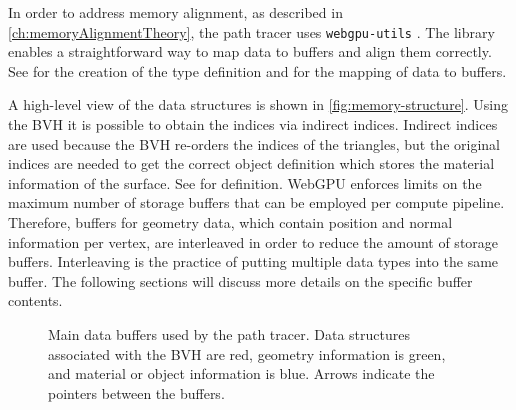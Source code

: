 In order to address memory alignment, as described in \autoref{ch:memoryAlignmentTheory}, the path tracer uses \texttt{webgpu-utils} \cite{webgpuUtilsLib}. The library enables a straightforward way to map data to buffers and align them correctly. See  for the creation of the type definition and  for the mapping of data to buffers.

A high-level view of the data structures is shown in \autoref{fig:memory-structure}. Using the \gls{BVH} it is possible to obtain the indices via indirect indices. Indirect indices are used because the \gls{BVH} re-orders the indices of the triangles, but the original indices are needed to get the correct object definition which stores the material information of the surface. See  for definition. \gls{WebGPU} enforces limits on the maximum number of storage buffers that can be employed per compute pipeline. Therefore, buffers for geometry data, which contain position and normal information per vertex, are interleaved in order to reduce the amount of storage buffers. Interleaving is the practice of putting multiple data types into the same buffer. The following sections will discuss more details on the specific buffer contents.

\begin{figure}[H]
    \centering
    \caption{Main data buffers used by the path tracer. Data structures associated with the \gls{BVH} are red, geometry information is green, and material or object information is blue. Arrows indicate the pointers between the buffers.}
    \label{fig:memory-structure}
\end{figure}


